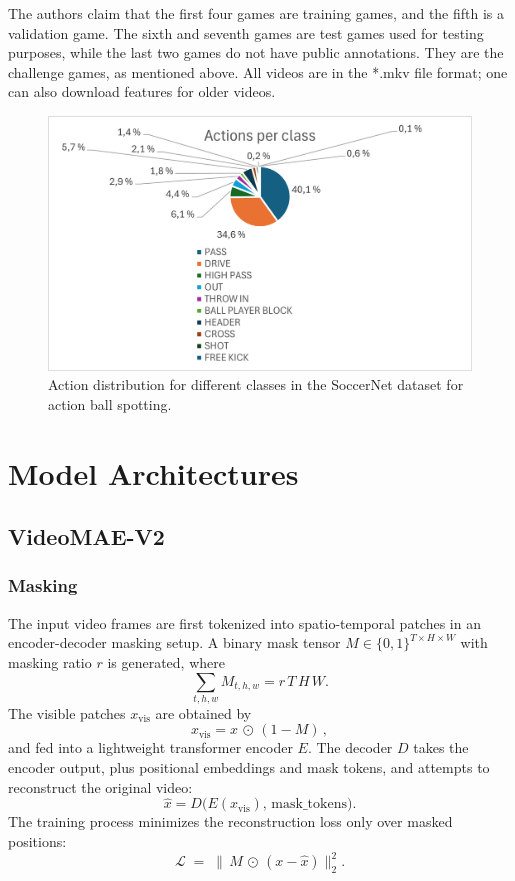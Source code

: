 The authors claim that the first four games are training games, and the fifth is a validation game. The sixth and seventh games are test games used for testing purposes, while the last two games do not have public annotations. They are the challenge games, as mentioned above. All videos are in the *.mkv file format; one can also download features for older videos. 

\begin{figure}
    \centering
    \includegraphics[width=1\linewidth]{figures/actions_per_class.png}
    \caption{Action distribution for different classes in the SoccerNet dataset for action ball spotting.}
    \label{fig:soccernet_dist}
\end{figure}


\section{Model Architectures}
\label{sec:model_architectures}

\subsection{VideoMAE-V2}
\label{ssec:videomae_v2}

\subsubsection{Masking}

The input video frames are first tokenized into spatio-temporal patches in an encoder-decoder masking setup. A binary mask tensor \(M\in\{0,1\}^{T\times H\times W}\) with masking ratio \(r\) is generated, where
\[
\sum_{t,h,w} M_{t,h,w} = r\,T\,H\,W.
\]
The visible patches \(x_\text{vis}\) are obtained by
\[
x_\text{vis} = x \,\odot\,(1 - M)\,,
\]
and fed into a lightweight transformer encoder \(E\). The decoder \(D\) takes the encoder output, plus positional embeddings and mask tokens, and attempts to reconstruct the original video:
\[
\hat{x} = D\bigl(E(x_\text{vis}),\,\text{mask\_tokens}\bigr).
\]
The training process minimizes the reconstruction loss only over masked positions:
\[
\mathcal{L} \;=\; \bigl\lVert\,M \,\odot\,(x - \hat{x})\bigr\rVert_2^2.
\]


